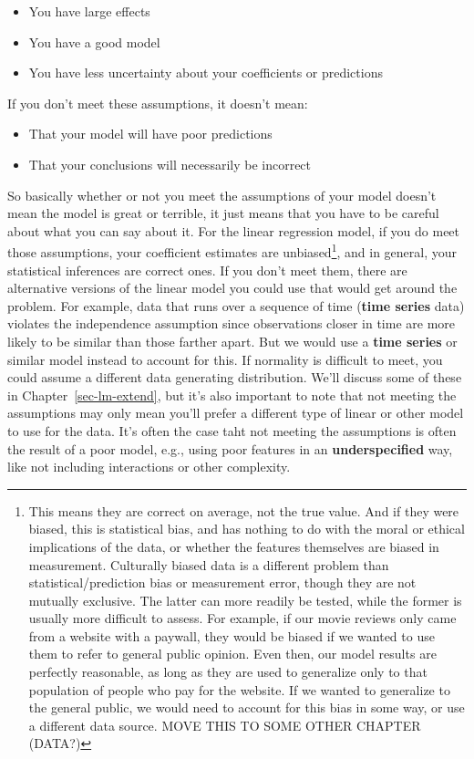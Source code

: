 \documentclass[
  letterpaper,
]{krantz}
\providecommand{\tightlist}{%
  \setlength{\itemsep}{0pt}\setlength{\parskip}{0pt}}\usepackage{longtable,booktabs,array}
\begin{document}
\begin{itemize}
\tightlist
\item
  You have large effects
\item
  You have a good model
\item
  You have less uncertainty about your coefficients or predictions
\end{itemize}

If you don't meet these assumptions, it doesn't mean:

\begin{itemize}
\tightlist
\item
  That your model will have poor predictions
\item
  That your conclusions will necessarily be incorrect
\end{itemize}

So basically whether or not you meet the assumptions of your model
doesn't mean the model is great or terrible, it just means that you have
to be careful about what you can say about it. For the linear regression
model, if you do meet those assumptions, your coefficient estimates are
unbiased\footnote{This means they are correct on average, not the true
  value. And if they were biased, this is statistical bias, and has
  nothing to do with the moral or ethical implications of the data, or
  whether the features themselves are biased in measurement. Culturally
  biased data is a different problem than statistical/prediction bias or
  measurement error, though they are not mutually exclusive. The latter
  can more readily be tested, while the former is usually more difficult
  to assess. For example, if our movie reviews only came from a website
  with a paywall, they would be biased if we wanted to use them to refer
  to general public opinion. Even then, our model results are perfectly
  reasonable, as long as they are used to generalize only to that
  population of people who pay for the website. If we wanted to
  generalize to the general public, we would need to account for this
  bias in some way, or use a different data source. MOVE THIS TO SOME
  OTHER CHAPTER (DATA?)}, and in general, your statistical inferences
are correct ones. If you don't meet them, there are alternative versions
of the linear model you could use that would get around the problem. For
example, data that runs over a sequence of time (\textbf{time series}
data) violates the independence assumption since observations closer in
time are more likely to be similar than those farther apart. But we
would use a \textbf{time series} or similar model instead to account for
this. If normality is difficult to meet, you could assume a different
data generating distribution. We'll discuss some of these in
Chapter~\ref{sec-lm-extend}, but it's also important to note that not
meeting the assumptions may only mean you'll prefer a different type of
linear or other model to use for the data. It's often the case taht not
meeting the assumptions is often the result of a poor model, e.g., using
poor features in an \textbf{underspecified} way, like not including
interactions or other complexity.
\end{document}
